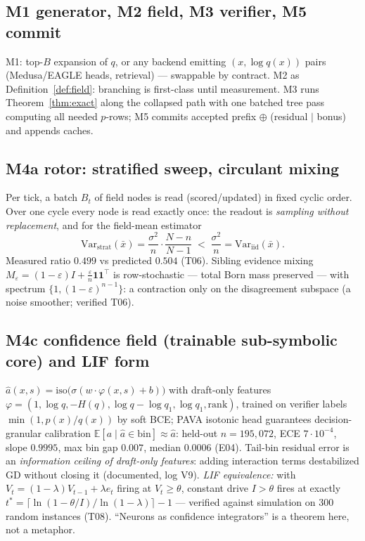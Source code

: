 \documentclass[11pt,a4paper]{article}
\theoremstyle{definition}
\begin{document}
\subsection{M1 generator, M2 field, M3 verifier, M5 commit}
M1: top-$B$ expansion of $q$, or any backend emitting
$(x,\log q(x))$ pairs (Medusa/EAGLE heads, retrieval) --- swappable by
contract. M2 as Definition~\ref{def:field}: branching is first-class until
measurement. M3 runs Theorem~\ref{thm:exact} along the collapsed path with
one batched tree pass computing all needed $p$-rows; M5 commits
accepted prefix $\oplus$ (residual $\mid$ bonus) and appends caches.

\subsection{M4a rotor: stratified sweep, circulant mixing}
\label{sec:rotor}
Per tick, a batch $B_t$ of field nodes is read (scored/updated) in fixed
cyclic order. Over one cycle every node is read exactly once: the readout is
\emph{sampling without replacement}, and for the field-mean estimator
\begin{equation}
\mathrm{Var}_{\text{strat}}(\bar x)=\frac{\sigma^2}{n}\cdot\frac{N-n}{N-1}
\;<\;\frac{\sigma^2}{n}=\mathrm{Var}_{\text{iid}}(\bar x).
\end{equation}
Measured ratio $0.499$ vs predicted $0.504$ (T06). Sibling evidence mixing
$M_\varepsilon=(1-\varepsilon)I+\frac{\varepsilon}{n}\mathbf 1\mathbf 1^\top$
is row-stochastic --- total Born mass preserved --- with spectrum
$\{1,(1-\varepsilon)^{n-1}\}$: a contraction only on the disagreement
subspace (a noise smoother; verified T06).

\subsection{M4c confidence field (trainable sub-symbolic core) and LIF form}
\label{sec:conf}
$\hat a(x,s)=\mathrm{iso}\big(\sigma(w\!\cdot\!\varphi(x,s)+b)\big)$ with
draft-only features
$\varphi\!=\!(1,\log q, -H(q), \log q\!-\!\log q_1, \log q_1, \mathrm{rank})$,
trained on verifier labels $\min(1,p(x)/q(x))$ by soft BCE; PAVA isotonic head
guarantees decision-granular calibration
$\mathbb E[a\mid\hat a\in\text{bin}]\approx\hat a$:
held-out $n=195{,}072$, ECE $7\cdot10^{-4}$, slope $0.9995$, max bin gap
$0.007$, median $0.0006$ (E04). Tail-bin residual error is an
\emph{information ceiling of draft-only features}: adding interaction terms
destabilized GD without closing it (documented, log V9).
\emph{LIF equivalence:} with
$V_t=(1-\lambda)V_{t-1}+\lambda e_t$ firing at $V_t\ge\theta$, constant drive
$I>\theta$ fires at exactly
$t^\ast=\lceil\ln(1-\theta/I)/\ln(1-\lambda)\rceil-1$ --- verified against
simulation on 300 random instances (T08). ``Neurons as confidence
integrators'' is a theorem here, not a metaphor.
\end{document}
